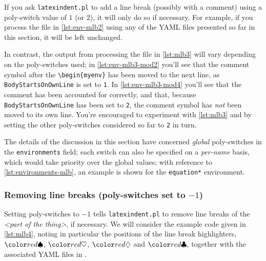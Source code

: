 If you ask \texttt{latexindent.pl} to add a line break (possibly with a comment) using a poly-switch value of $1$ (or $2$),
it will only do so if necessary. For example, if you process the file in \vref{lst:env-mlb2} using any of the YAML 
files presented so far in this section, it will be left unchanged.

\begin{minipage}{.45\linewidth}
\end{minipage}
\hfill
\begin{minipage}{.45\linewidth}
\end{minipage}

In contrast, the output from processing the file in \cref{lst:mlb3} will vary depending 
on the poly-switches used; in \cref{lst:env-mlb3-mod2} you'll see that the comment symbol after 
the \lstinline!\begin{myenv}! has been moved to the next line, as \texttt{BodyStartsOnOwnLine} 
  is set to \texttt{1}. In \cref{lst:env-mlb3-mod4} you'll see that the comment has been accounted 
  for correctly, and that, because \texttt{BodyStartsOnOwnLine} has been set to \texttt{2}, 
  the comment symbol has \emph{not} been moved to its own line. You're encouraged to experiment 
  with \cref{lst:mlb3} and by setting the other poly-switches considered so far to \texttt{2} in turn.

\begin{minipage}{.45\linewidth}
\end{minipage}
\hfill
\begin{minipage}{.45\linewidth}
\end{minipage}

The details of the discussion in this section have concerned \emph{global} poly-switches in the \texttt{environments} field;
each switch can also be specified on a \emph{per-name} basis, which would take priority over the global values; with 
reference to \vref{lst:environments-mlb}, an example is shown for the \texttt{equation*} environment.

\subsubsection{Removing line breaks (poly-switches set to $-1$)}
Setting poly-switches to $-1$ tells \texttt{latexindent.pl} to remove line breaks of the \emph{<part of the thing>}, if necessary. We will consider the
example code given in \cref{lst:mlb4}, noting in particular the positions of 
the line break highlighters, $\BeginStartsOnOwnLine$, $\BodyStartsOnOwnLine$, $\EndStartsOnOwnLine$
and $\EndFinishesWithLineBreak$, together with the associated YAML files in .

